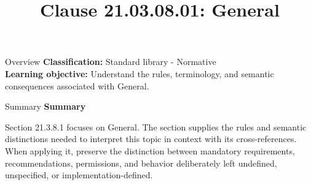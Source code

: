 \documentclass[10pt,letterpaper]{article}
\title{Clause 21.03.08.01: General}
\author{}
\date{}
\begin{document}
\maketitle
\begin{CornellOverviewBox}{Overview}
\textbf{Classification:} Standard library - Normative\\[2pt]
\textbf{Learning objective:} Understand the rules, terminology, and semantic consequences associated with General.
\end{CornellOverviewBox}\begin{CornellSummaryBox}{Summary}
{\sffamily\bfseries\color{Accent} Summary}\par\vspace{3pt}Section 21.3.8.1 focuses on General. The section supplies the rules and semantic distinctions needed to interpret this topic in context with its cross-references. When applying it, preserve the distinction between mandatory requirements, recommendations, permissions, and behavior deliberately left undefined, unspecified, or implementation-defined.
\end{CornellSummaryBox}
\end{document}
